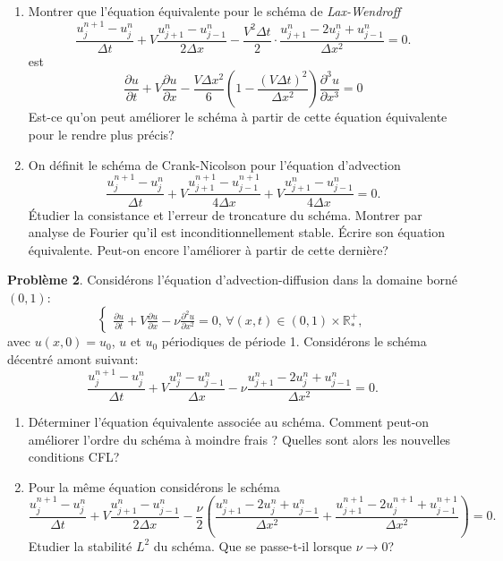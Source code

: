 \documentclass[12pt,a4paper]{article}
\begin{document}
\begin{enumerate}
\item Montrer que l'\'equation \'equivalente pour le sch\'ema de {\it Lax-Wendroff} 
$$
\frac{u_j^{n+1}-u_{j}^{n}}{\Delta t}+V
\frac{u_{j+1}^{n}-u_{j-1}^{n}}{2\Delta x}-\frac{V^2\Delta t}{2}\cdot \frac{u_{j+1}^{n}-2u_j^n+u_{j-1}^{n}}{\Delta x^2}=0.
$$
est
$$
\displaystyle\frac{\partial u}{\partial t}+V\frac{\partial u}{\partial
  x} -\frac{V\Delta x^2}{6}\left(1-\frac{(V\Delta t)^2}{\Delta x^2}\right)\frac{\partial^3 u}{\partial x^3}=0
$$
Est-ce qu'on peut am\'eliorer le sch\'ema \`a partir de cette
\'equation \'equivalente pour le rendre plus pr\'ecis?
\item On d\'efinit le sch\'ema de Crank-Nicolson pour l'\'equation d'advection
$$
\frac{u_j^{n+1}-u_{j}^{n}}{\Delta t}+V
\frac{u_{j+1}^{n+1}-u_{j-1}^{n+1}}{4\Delta x}+V
\frac{u_{j+1}^{n}-u_{j-1}^{n}}{4\Delta x}=0.
$$
\'Etudier la consistance et l'erreur de troncature du
sch\'ema. Montrer par analyse de Fourier qu'il est
inconditionnellement stable. \'Ecrire son \'equation
\'equivalente. Peut-on encore l'am\'eliorer \`a partir de cette derni\`ere?
\end{enumerate}
{\bf Probl\`eme 2}. Consid\'erons l'\'equation d'advection-diffusion dans la domaine born\'e $(0,1)$:
$$
\begin{cases}
\displaystyle\frac{\partial u}{\partial t}+V\frac{\partial u}{\partial
  x}-\nu\frac{\partial^2u}{\partial x^2}=0,\, \forall (x,t)\in(0,1)\times\mathbb{R}^+_*,
\end{cases}
$$
avec $u(x, 0) = u_0$, $u$ et $u_0$ p\'eriodiques de p\'eriode 1. Consid\'erons le sch\'ema d\'ecentr\'e amont suivant:
$$
\frac{u_j^{n+1}-u_{j}^{n}}{\Delta t}+V
\frac{u_{j}^{n}-u_{j-1}^{n}}{\Delta x}-\nu\frac{u_{j+1}^{n}-2u_j^n+u_{j-1}^{n}}{\Delta x^2}=0.
$$
\begin{enumerate}
\item D\'eterminer l'\'equation \'equivalente associ\'ee au sch\'ema. Comment peut-on
am\'eliorer l'ordre du sch\'ema \`a moindre frais ? 
Quelles sont alors les nouvelles conditions CFL?
 \item Pour la m\^eme \'equation consid\'erons le sch\'ema
 $$
 \frac{u_j^{n+1}-u_{j}^{n}}{\Delta t}+V
 \frac{u_{j+1}^{n}-u_{j-1}^{n}}{2\Delta x}-\frac{\nu}{2}\left(\frac{u_{j+1}^{n}-2u_j^n+u_{j-1}^{n}}{\Delta x^2}+\frac{u_{j+1}^{n+1}-2u_j^{n+1}+u_{j-1}^{n+1}}{\Delta x^2}\right)=0.
 $$
 Etudier la stabilit\'e $L^2$ du sch\'ema. Que se passe-t-il lorsque
 $\nu\rightarrow 0$?
\end{enumerate}

\end{document}

